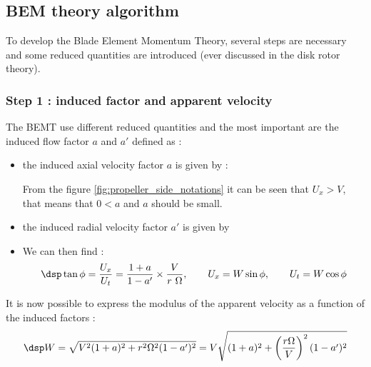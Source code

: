 \subsection{BEM theory algorithm}

To develop the Blade Element Momentum Theory, several steps are necessary and some reduced quantities are 
introduced (ever discussed in the disk rotor theory).

\subsubsection{\sc Step 1 : induced factor and apparent velocity}
The BEMT use different reduced quantities and the most important are the induced flow factor $a$ and $a'$ defined as :

\begin{itemize}
\item the induced axial velocity factor $a$ is given by :

From the figure \ref{fig:propeller_side_notations} it can be seen that $U_x > V$, that means that $0 < a $ and $a$ should be small.


\item the induced radial velocity factor $a'$ is given by 



\item We can then find :
\begin{equation} \dsp
\tan \phi = \frac{U_x}{U_t} = \frac{1 + a}{1-a'} \times \frac{V}{r~\Omega}, \qquad U_x = W \sin\phi, \qquad U_t = W \cos\phi
\label{eq:tanphi_prop}
\end{equation}
\end{itemize}

It is now possible to express the modulus of the apparent velocity as a function of the induced factors :
\begin{equation}
\dsp W = \sqrt{V^2(1+a)^2 + r^2 \Omega^2 (1-a')^2} = V  \sqrt{(1+a)^2 + \left(\frac{r \Omega}{V}\right)^2 (1-a')^2}
\label{eq:W_prop}
\end{equation}


